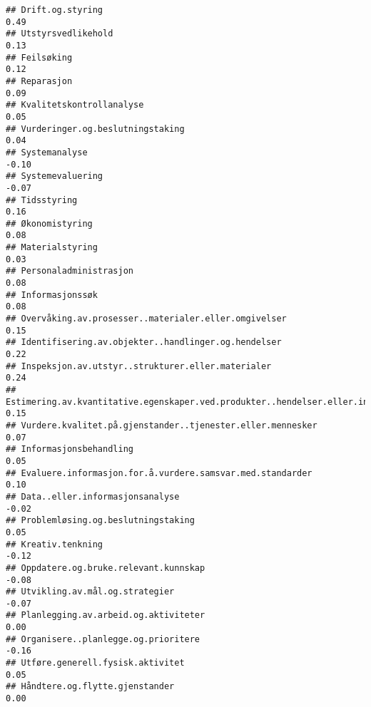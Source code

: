 \documentclass[
]{article}
\begin{document}
\begin{verbatim}
## Drift.og.styring                                                                  0.49
## Utstyrsvedlikehold                                                                0.13
## Feilsøking                                                                        0.12
## Reparasjon                                                                        0.09
## Kvalitetskontrollanalyse                                                          0.05
## Vurderinger.og.beslutningstaking                                                  0.04
## Systemanalyse                                                                    -0.10
## Systemevaluering                                                                 -0.07
## Tidsstyring                                                                       0.16
## Økonomistyring                                                                    0.08
## Materialstyring                                                                   0.03
## Personaladministrasjon                                                            0.08
## Informasjonssøk                                                                   0.08
## Overvåking.av.prosesser..materialer.eller.omgivelser                              0.15
## Identifisering.av.objekter..handlinger.og.hendelser                               0.22
## Inspeksjon.av.utstyr..strukturer.eller.materialer                                 0.24
## Estimering.av.kvantitative.egenskaper.ved.produkter..hendelser.eller.informasjon  0.15
## Vurdere.kvalitet.på.gjenstander..tjenester.eller.mennesker                        0.07
## Informasjonsbehandling                                                            0.05
## Evaluere.informasjon.for.å.vurdere.samsvar.med.standarder                         0.10
## Data..eller.informasjonsanalyse                                                  -0.02
## Problemløsing.og.beslutningstaking                                                0.05
## Kreativ.tenkning                                                                 -0.12
## Oppdatere.og.bruke.relevant.kunnskap                                             -0.08
## Utvikling.av.mål.og.strategier                                                   -0.07
## Planlegging.av.arbeid.og.aktiviteter                                              0.00
## Organisere..planlegge.og.prioritere                                              -0.16
## Utføre.generell.fysisk.aktivitet                                                  0.05
## Håndtere.og.flytte.gjenstander                                                    0.00

\end{verbatim}
\end{document}
